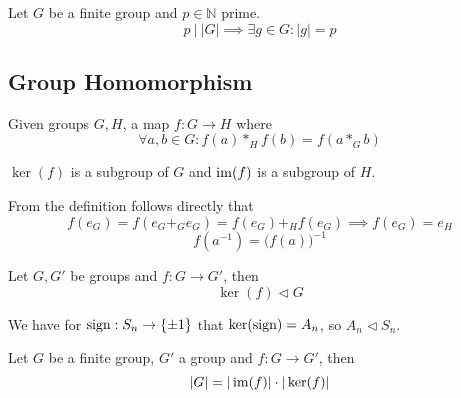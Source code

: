 \begin{corollary}
   Let \(G\) be a finite group and \(p \in \mathbb{N}\) prime.
   \[p~|~|G| \implies \exists g \in G: |g| = p\]
\end{corollary}


\subsection{Group Homomorphism}
\begin{definition}
   Given groups \(G, H\), a map \(f: G \to H\) where
   \[\forall a, b \in G: f(a) \ast_H f(b) = f(a \ast_G b)\]
\end{definition}
\begin{remark}
   \(\ker(f)\) is a subgroup of \(G\) and \(\operatorname{im}(f)\) is a subgroup of \(H\).
\end{remark}
\begin{remark}
   From the definition follows directly that
   \[f(e_G) = f(e_G +_G e_G) = f(e_G) +_H f(e_G) \implies f(e_G) = e_H\]
   \[f(a^{-1}) = \big(f(a)\big)^{-1}\]
\end{remark}

\begin{proposition}\label{pro:ker_subgrp}
   Let \(G, G'\) be groups and \(f: G \to G'\), then
   \[\ker(f) \triangleleft G\]
\end{proposition}
\begin{example}
   We have for \(\operatorname{sign}: S_n \to \{\pm 1\}\) that \(\ker(\operatorname{sign}) = A_n\), so \(A_n \triangleleft S_n\).
\end{example}

\begin{corollary}
   Let \(G\) be a finite group, \(G'\) a group and \(f: G \to G'\), then
   \[|G| = |\operatorname{im}(f)| \cdot |\ker(f)|\]
\end{corollary}

